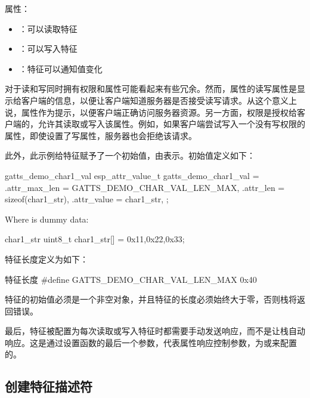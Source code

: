 \documentclass[lang=cn,newtx,10pt,scheme=chinese]{elegantbook}
\begin{document}
属性：

\begin{itemize}
\item {}：可以读取特征
\item {}：可以写入特征
\item {}：特征可以通知值变化
\end{itemize}

对于读和写同时拥有权限和属性可能看起来有些冗余。然而，属性的读写属性是显示给客户端的信息，以便让客户端知道服务器是否接受读写请求。从这个意义上说，属性作为提示，以便客户端正确访问服务器资源。另一方面，权限是授权给客户端的，允许其读取或写入该属性。例如，如果客户端尝试写入一个没有写权限的属性，即使设置了写属性，服务器也会拒绝该请求。

此外，此示例给特征赋予了一个初始值，由表示。初始值定义如下：

\begin{mycode}{gatts\_demo\_char1\_val}
esp_attr_value_t gatts_demo_char1_val =
{
    .attr_max_len = GATTS_DEMO_CHAR_VAL_LEN_MAX,
    .attr_len     = sizeof(char1_str),
    .attr_value   = char1_str,
};
\end{mycode}

Where  is dummy data:

\begin{mycode}{char1\_str}
uint8_t char1_str[] = {0x11,0x22,0x33};
\end{mycode}

特征长度定义为如下：

\begin{mycode}{特征长度}
#define GATTS_DEMO_CHAR_VAL_LEN_MAX 0x40
\end{mycode}

特征的初始值必须是一个非空对象，并且特征的长度必须始终大于零，否则栈将返回错误。

最后，特征被配置为每次读取或写入特征时都需要手动发送响应，而不是让栈自动响应。这是通过设置函数的最后一个参数，代表属性响应控制参数，为或来配置的。

\subsection{创建特征描述符}
\end{document}
